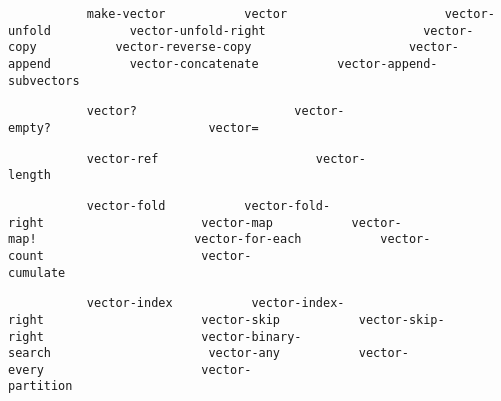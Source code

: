 \begin{description}
\tightlist
\item[{
·~\protect\hyperlink{Constructors}{Constructors}\\[2\baselineskip]}]
\texttt{\ \ \ \ \ \ \ \ \ \ \ make-vector\ \ \ \ \ \ \ \ \ \ \ vector\ \ \ \ \ \ \ \ \ \ \ \ \ \ \ \ \ \ \ \ \ \ vector-unfold\ \ \ \ \ \ \ \ \ \ \ vector-unfold-right\ \ \ \ \ \ \ \ \ \ \ \ \ \ \ \ \ \ \ \ \ \ vector-copy\ \ \ \ \ \ \ \ \ \ \ vector-reverse-copy\ \ \ \ \ \ \ \ \ \ \ \ \ \ \ \ \ \ \ \ \ \ vector-append\ \ \ \ \ \ \ \ \ \ \ vector-concatenate\ \ \ \ \ \ \ \ \ \ \ vector-append-subvectors\ \ \ \ \ \ \ \ \ \ \ \ \ \ \ \ \ \ \ \ \ \ \ \ \ \ \ \ \ \ \ }
\item[{ ·~\protect\hyperlink{Predicates}{Predicates}\\[2\baselineskip]}]
\texttt{\ \ \ \ \ \ \ \ \ \ \ vector?\ \ \ \ \ \ \ \ \ \ \ \ \ \ \ \ \ \ \ \ \ \ vector-empty?\ \ \ \ \ \ \ \ \ \ \ \ \ \ \ \ \ \ \ \ \ \ vector=\ \ \ \ \ \ \ \ \ \ \ \ \ \ \ \ \ \ \ \ \ \ \ \ \ \ \ \ \ \ \ }
\item[{ ·~\protect\hyperlink{Selectors}{Selectors}\\[2\baselineskip]}]
\texttt{\ \ \ \ \ \ \ \ \ \ \ vector-ref\ \ \ \ \ \ \ \ \ \ \ \ \ \ \ \ \ \ \ \ \ \ vector-length\ \ \ \ \ \ \ \ \ \ \ \ \ \ \ \ \ \ \ \ \ \ \ \ \ \ \ \ \ \ \ }
\item[{ ·~\protect\hyperlink{Iteration}{Iteration}\\[2\baselineskip]}]
\texttt{\ \ \ \ \ \ \ \ \ \ \ vector-fold\ \ \ \ \ \ \ \ \ \ \ vector-fold-right\ \ \ \ \ \ \ \ \ \ \ \ \ \ \ \ \ \ \ \ \ \ vector-map\ \ \ \ \ \ \ \ \ \ \ vector-map!\ \ \ \ \ \ \ \ \ \ \ \ \ \ \ \ \ \ \ \ \ \ vector-for-each\ \ \ \ \ \ \ \ \ \ \ vector-count\ \ \ \ \ \ \ \ \ \ \ \ \ \ \ \ \ \ \ \ \ \ vector-cumulate\ \ \ \ \ \ \ \ \ \ \ \ \ \ \ \ \ \ \ \ \ \ \ \ \ \ \ \ \ \ \ }
\item[{ ·~\protect\hyperlink{Searching}{Searching}\\[2\baselineskip]}]
\texttt{\ \ \ \ \ \ \ \ \ \ \ vector-index\ \ \ \ \ \ \ \ \ \ \ vector-index-right\ \ \ \ \ \ \ \ \ \ \ \ \ \ \ \ \ \ \ \ \ \ vector-skip\ \ \ \ \ \ \ \ \ \ \ vector-skip-right\ \ \ \ \ \ \ \ \ \ \ \ \ \ \ \ \ \ \ \ \ \ vector-binary-search\ \ \ \ \ \ \ \ \ \ \ \ \ \ \ \ \ \ \ \ \ \ vector-any\ \ \ \ \ \ \ \ \ \ \ vector-every\ \ \ \ \ \ \ \ \ \ \ \ \ \ \ \ \ \ \ \ \ \ vector-partition\ \ \ \ \ \ \ \ \ \ \ \ \ \ \ \ \ \ \ \ \ \ \ \ \ \ \ \ \ \ \ }
\item[{ ·~\protect\hyperlink{Mutators}{Mutators}\\[2\baselineskip]}]

\end{description}
